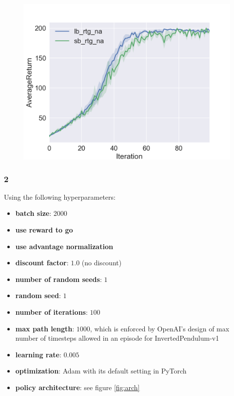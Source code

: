\documentclass[a4paper]{article}
\theoremstyle{definition}
\begin{document}
\begin{figure}[H]
\begin{minipage}{.3\textwidth}
\includegraphics[width=\linewidth]{figures/4_2_1_rtg_na.png}
\end{minipage}
\end{figure}

\subsubsection*{2}

Using the following hyperparameters:
\begin{itemize}
\item \textbf{batch size}: 2000
\item \textbf{use reward to go}
\item \textbf{use advantage normalization}
\item \textbf{discount factor}: $1.0$ (no discount)
\item \textbf{number of random seeds}: $1$
\item \textbf{random seed}: $1$
\item \textbf{number of iterations}: $100$
\item \textbf{max path length}: $1000$, which is enforced by OpenAI's design of max number of timesteps allowed in an episode for InvertedPendulum-v1
\item \textbf{learning rate}: $0.005$
\item \textbf{optimization}: Adam with its default setting in PyTorch
\item \textbf{policy architecture}: see figure \ref{fig:arch}

\end{itemize}
\end{document}
